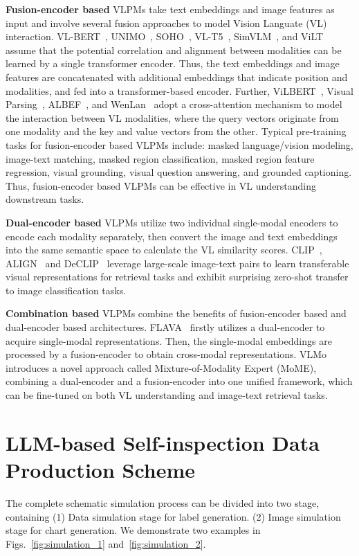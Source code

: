 \documentclass{article} \usepackage{iclr2024_conference,times}
\begin{document}
{\noindent\textbf{Fusion-encoder based} VLPMs take text embeddings and image features
as input and involve several fusion approaches to model Vision Languate (VL) interaction. VL-BERT~\citep{Su2019VLBERTPO}, UNIMO~\citep{Li2020UNIMOTU,Li2022UNIMO2EU}, SOHO~\citep{Huang2021SeeingOO}, VL-T5~\citep{Cho2021UnifyingVT}, SimVLM~\citep{Wang2021SimVLMSV}, and ViLT~\citep{Kim2021ViLTVT} assume that the potential correlation and alignment between modalities can be learned by a single transformer encoder. Thus, the text embeddings and image features are concatenated with additional embeddings that indicate position and modalities, and fed into a transformer-based encoder. 
Further, ViLBERT~\citep{Lu2019ViLBERTPT}, Visual Parsing~\citep{Xue2021ProbingIV}, ALBEF~\citep{Li2021AlignBF}, and WenLan~\citep{Huo2021WenLanBV} adopt a cross-attention mechanism to model the interaction between VL modalities, where the query vectors originate from one modality and the key and value vectors from the other. Typical pre-training tasks for fusion-encoder based VLPMs include: masked language/vision modeling, image-text matching, masked region classification, masked region feature regression, visual grounding, visual question answering, and grounded captioning. Thus, fusion-encoder based VLPMs can be effective in VL understanding downstream tasks.

\noindent\textbf{Dual-encoder based} VLPMs utilize two individual single-modal encoders to encode each modality separately, then convert the image and text embeddings into the same semantic space to calculate the VL similarity scores. 
CLIP~\citep{Cho2021UnifyingVT}, ALIGN~\citep{Jia2021ScalingUV} and DeCLIP~\citep{Li2021SupervisionEE} leverage large-scale image-text pairs to learn transferable visual representations for retrieval tasks and exhibit surprising zero-shot transfer to image classification tasks.

\noindent\textbf{Combination based} VLPMs combine the benefits of fusion-encoder based and dual-encoder based architectures. FLAVA~\citep{Singh2021FLAVAAF} firstly utilizes a dual-encoder to acquire single-modal representations. Then, the single-modal embeddings are processed by a fusion-encoder to obtain cross-modal representations. VLMo~\citep{Wang2021VLMoUV} introduces a novel approach called Mixture-of-Modality Expert (MoME), combining a dual-encoder and a fusion-encoder into one unified framework, which can be fine-tuned on both VL understanding and image-text retrieval tasks.

\section{LLM-based Self-inspection Data Production Scheme}
\label{app:simulation}
The complete schematic simulation process can be divided into two stage, containing (1) Data simulation stage for label generation. (2) Image simulation stage for chart generation. We demonstrate two examples in Figs.~\ref{fig:simulation_1} and~\ref{fig:simulation_2}.

}
\end{document}
